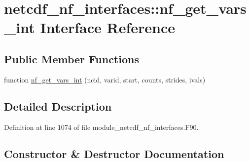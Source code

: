 \hypertarget{interfacenetcdf__nf__interfaces_1_1nf__get__vars__int}{}\section{netcdf\+\_\+nf\+\_\+interfaces\+:\+:nf\+\_\+get\+\_\+vars\+\_\+int Interface Reference}
\label{interfacenetcdf__nf__interfaces_1_1nf__get__vars__int}
\subsection*{Public Member Functions}
\begin{DoxyCompactItemize}
\item 
function \hyperlink{interfacenetcdf__nf__interfaces_1_1nf__get__vars__int_a414613b7cb8c9489a6c04ea82f95d17d}{nf\+\_\+get\+\_\+vars\+\_\+int} (ncid, varid, start, counts, strides, ivals)
\end{DoxyCompactItemize}


\subsection{Detailed Description}


Definition at line 1074 of file module\+\_\+netcdf\+\_\+nf\+\_\+interfaces.\+F90.



\subsection{Constructor \& Destructor Documentation}
\mbox{\label{interfacenetcdf__nf__interfaces_1_1nf__get__vars__int_a414613b7cb8c9489a6c04ea82f95d17d}} 
